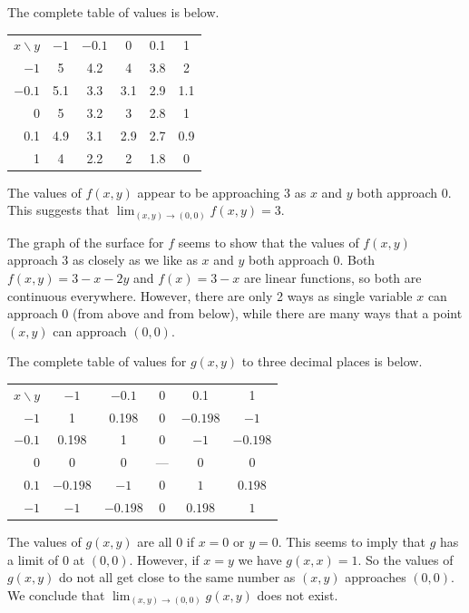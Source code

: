 \begin{activitySolution}
\item The complete table of values is below.   

  \begin{center}
    \begin{tabular}{|r||c|c|c|c|c|}
      \hline
      $x\backslash y$ &$-1$ & $-0.1$ & 0 & 0.1 & 1 \\
      \hhline{|=|=|=|=|=|=|}
      $-1$ 	&5 	&4.2 	&4		&3.8 &2 \\
      \hline
      $-0.1$ &5.1 	&3.3 	&3.1 	&2.9 &1.1 \\
      \hline
      0 		&5 	&3.2 	&3 	&2.8 &1 \\
      \hline
      0.1 		&4.9 	&3.1	&2.9 	&2.7 &0.9 \\
      \hline
      1 		&4 	&2.2 	&2 	&1.8 &0 \\
      \hline
    \end{tabular}
  \end{center}
  The values of $f(x,y)$ appear to be approaching 3 as $x$ and $y$ both approach $0$. This suggests that $\lim_{(x,y)\to(0,0)} f(x,y) = 3$.

\item The graph of the surface for $f$ seems to show that the values of $f(x,y)$ approach $3$ as closely as we like as $x$ and $y$ both approach 0. Both $f(x,y) = 3-x-2y$ and $f(x) = 3-x$ are linear functions, so both are continuous everywhere. However, there are only 2 ways as single variable $x$ can approach 0 (from above and from below), while there are many ways that a point $(x,y)$ can approach $(0,0)$. 
      
\item The complete table of values for $g(x,y)$ to three decimal places is below.

  \begin{center}
    \begin{tabular}{|r||c|c|c|c|c|}
      \hline
      $x\backslash y$ &$-1$ &$-0.1$ & 0 & 0.1 & 1 \\
      \hhline{|=|=|=|=|=|=|}
	 $-1$  & 1 & 0.198 & 0 & $-0.198$ & $-1$ \\
      \hline
      $-0.1$ &0.198 &1 &0 &$-1$ &$-0.198$ \\
      \hline
      0  &0  &0  & --- &0 &0 \\
      \hline
       $0.1$ &$-0.198$ &$-1$ &0 &$1$ &$0.198$ \\
      \hline
      $-1$  & $-1$ & $-0.198$ & 0 & $0.198$ & $1$ \\
      \hline
    \end{tabular}
  \end{center}
  The values of $g(x,y)$ are all 0 if $x=0$ or $y=0$. This seems to imply that $g$ has a limit of $0$ at $(0,0)$. However, if $x=y$ we have $g(x,x) = 1$. So the values of $g(x,y)$ do not all get close to the same number as $(x,y)$ approaches $(0,0)$. We conclude that $\lim_{(x,y)\to(0,0)} g(x,y)$ does not exist. 


\end{activitySolution}

